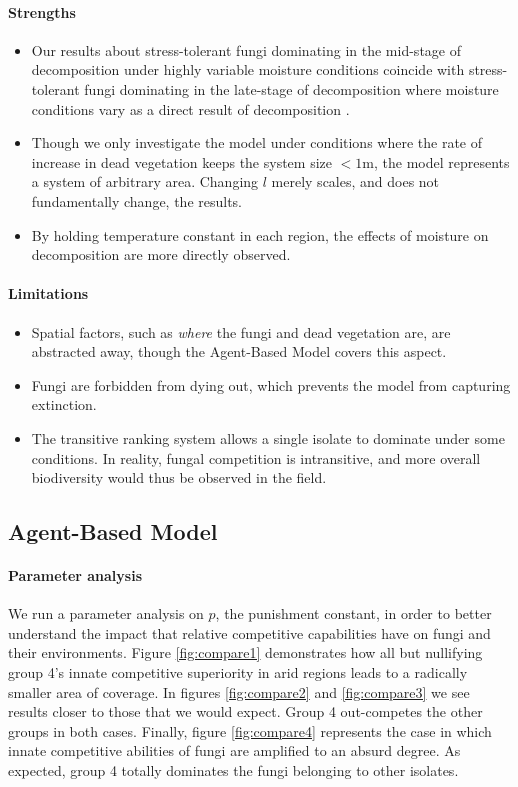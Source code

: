 \documentclass[12pt]{article}
\begin{document}
\paragraph{Strengths}
\begin{itemize}
    \item Our results about stress-tolerant fungi dominating in the mid-stage of decomposition under highly variable moisture conditions coincide with stress-tolerant fungi dominating in the late-stage of decomposition where moisture conditions vary as a direct result of decomposition  \cite{untangling}.
    \item Though we only investigate the model under conditions where the rate of increase in dead vegetation keeps the system size $<1$m, the model represents a system of arbitrary area. Changing $l$ merely scales, and does not fundamentally change, the results.
    \item By holding temperature constant in each region, the effects of moisture on decomposition are more directly observed.
\end{itemize}

\paragraph{Limitations}
\begin{itemize}
    \item Spatial factors, such as \emph{where} the fungi and dead vegetation are, are abstracted away, though the Agent-Based Model covers this aspect.
    \item Fungi are forbidden from dying out, which prevents the model from capturing extinction.
    \item The transitive ranking system allows a single isolate to dominate under some conditions. In reality, fungal competition is intransitive, and more overall biodiversity would thus be observed in the field.
\end{itemize}


\subsection{Agent-Based Model}
\paragraph{Parameter analysis}
We run a parameter analysis on $p$, the punishment constant, in order to better understand the impact that relative competitive capabilities have on fungi and their environments. Figure \ref{fig:compare1} demonstrates how all but nullifying group 4's innate competitive superiority in arid regions leads to a radically smaller area of coverage. In figures \ref{fig:compare2} and \ref{fig:compare3} we see results closer to those that we would expect. Group 4 out-competes the other groups in both cases. Finally, figure \ref{fig:compare4} represents the case in which innate competitive abilities of fungi are amplified to an absurd degree. As expected, group 4 totally dominates the fungi belonging to other isolates.   
\end{document}
